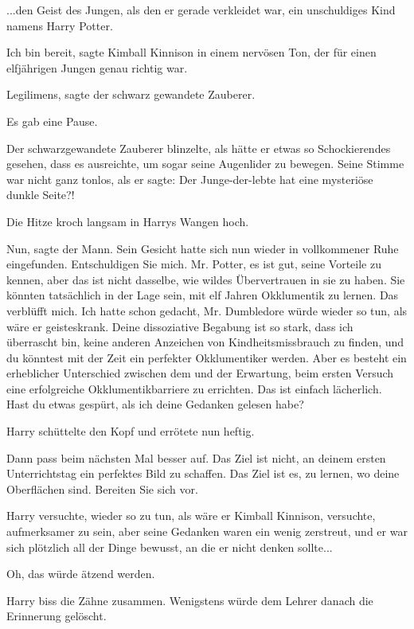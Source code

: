 ...den Geist des Jungen, als den er gerade verkleidet war, ein unschuldiges Kind
namens Harry Potter.

\glqq{}Ich bin bereit\grqq{}, sagte Kimball Kinnison in einem nervösen Ton, der
für einen elfjährigen Jungen genau richtig war.

\glqq{}Legilimens\grqq{}, sagte der schwarz gewandete Zauberer.

Es gab eine Pause.

Der schwarzgewandete Zauberer blinzelte, als hätte er etwas so Schockierendes
gesehen, dass es ausreichte, um sogar seine Augenlider zu bewegen. Seine Stimme
war nicht ganz tonlos, als er sagte: \glqq{}Der Junge-der-lebte hat eine
mysteriöse dunkle Seite?!\grqq{}

Die Hitze kroch langsam in Harrys Wangen hoch.

\glqq{}Nun\grqq{}, sagte der Mann. Sein Gesicht hatte sich nun wieder in
vollkommener Ruhe eingefunden. \glqq{}Entschuldigen Sie mich. Mr. Potter, es ist
gut, seine Vorteile zu kennen, aber das ist nicht dasselbe, wie wildes
Übervertrauen in sie zu haben. Sie könnten tatsächlich in der Lage sein, mit elf
Jahren Okklumentik zu lernen. Das verblüfft mich. Ich hatte schon gedacht, Mr.
Dumbledore würde wieder so tun, als wäre er geisteskrank. Deine dissoziative
Begabung ist so stark, dass ich überrascht bin, keine anderen Anzeichen von
Kindheitsmissbrauch zu finden, und du könntest mit der Zeit ein perfekter
Okklumentiker werden. Aber es besteht ein erheblicher Unterschied zwischen dem
und der Erwartung, beim ersten Versuch eine erfolgreiche Okklumentikbarriere zu
errichten. Das ist einfach lächerlich. Hast du etwas gespürt, als ich deine
Gedanken gelesen habe?\grqq{}

Harry schüttelte den Kopf und errötete nun heftig.

\glqq{}Dann pass beim nächsten Mal besser auf. Das Ziel ist nicht, an deinem
ersten Unterrichtstag ein perfektes Bild zu schaffen. Das Ziel ist es, zu
lernen, wo deine Oberflächen sind. Bereiten Sie sich vor.\grqq{}

Harry versuchte, wieder so zu tun, als wäre er Kimball Kinnison, versuchte,
aufmerksamer zu sein, aber seine Gedanken waren ein wenig zerstreut, und er war
sich plötzlich all der Dinge bewusst, an die er nicht denken sollte...

Oh, das würde ätzend werden.

Harry biss die Zähne zusammen. Wenigstens würde dem Lehrer danach die Erinnerung
gelöscht.

